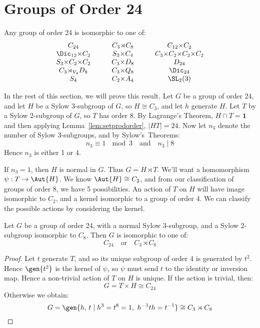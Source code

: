 \section{Groups of Order 24}
\begin{theorem}\label{thm:24}
    Any group of order 24 is isomorphic to one of:
    \begin{displaymath}
    \begin{array}{c@{\hskip 3em}c@{\hskip 3em}c}
        C_{24} & C_3{\rtimes}C_8 & C_{12}{\times}C_2 \\
        \Dic_{12}{\times}C_2 & S_3{\times}C_4 & C_3{\times}C_2{\times}C_2{\times}C_2 \\
        S_3{\times}C_2{\times}C_2 & C_3{\times}D_8 & D_{24} \\
        C_3{\rtimes_{V_4}}D_8 & C_3{\times}Q_8 & \Dic_{24} \\
        S_4 & C_2{\times}A_4 & \SL_2(3)
    \end{array}
    \end{displaymath}
\end{theorem}

In the rest of this section, we will prove this result.
Let \(G\) be a group of order 24, and let \(H\) be a Sylow 3-subgroup of \(G\), so \(H \cong C_3\), and let \(h\)
generate \(H\).
Let \(T\) by a Sylow 2-subgroup of \(G\), so \(T\) has order 8.
By Lagrange's Theorem, \(H \cap T = \bm{1}\) and then applying Lemma~\ref{lem:setprodorder}, \(|HT| = 24\).
Now let \(n_3\) denote the number of Sylow 3-subgroups, and by Sylow's~Theorems:
\[n_3 \equiv 1\ \mod{3} \quad \text{and} \quad n_3 \mid 8\]
Hence \(n_3\) is either 1 or 4.

If \(n_3 = 1\), then \(H\) is normal in \(G\).
Thus \(G = H \rtimes T\).
We'll want a homomorphism \(\psi: T \to \Aut{H}\).
We know \(\Aut{H} \cong C_2\), and from our classification of groups of order 8, we have 5 possibilities.
An action of \(T\) on \(H\) will have image isomorphic to \(C_2\), and a kernel isomorphic to a group of order 4.
We can classify the possible actions by considering the kernel.

\begin{lemma}\label{lem:24_first}
    Let \(G\) be a group of order 24, with a normal Sylow 3-subgroup, and a Sylow 2-subgroup isomorphic to \(C_8\).
    Then \(G\) is isomorphic to one of:
    \[
        C_{24} \quad \text{or} \quad%
        C_3 \rtimes C_{8}
    \]
\end{lemma}

\begin{proof}
    Let \(t\) generate \(T\), and so its unique subgroup of order 4 is generated by \(t^2\).
    Hence \(\gen{t^2}\) is the kernel of \(\psi\), so \(\psi\) must send \(t\) to the identity or
    inversion map.
    Hence a non-trivial action of \(T\) on \(H\) is unique.
    If the action is trivial, then:
    \[G = T \times H \cong C_{24}\]
    Otherwise we obtain:
    \[G = \gen{h,\,t \mid h^3 = t^8 = 1,\ h^{-1}th = t^{-1}} \cong C_3 \rtimes C_8\]
\end{proof}

